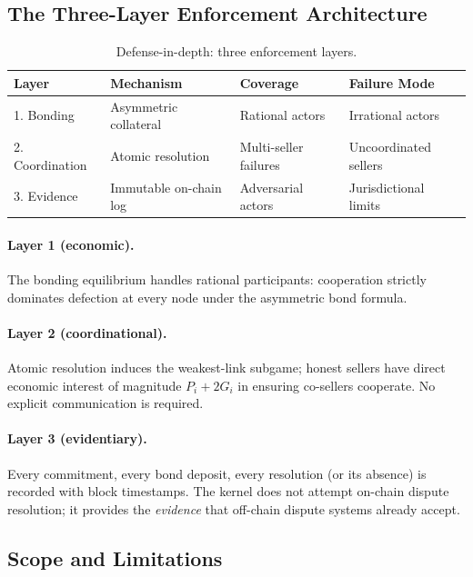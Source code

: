 \documentclass[11pt,a4paper]{article}
\theoremstyle{definition}
\theoremstyle{remark}
\newcommand{\pay}{P}
\newcommand{\cumval}{G}
\begin{document}
\subsection{The Three-Layer Enforcement Architecture}

\begin{table}[ht]
\centering
\caption{Defense-in-depth: three enforcement layers.}
\label{tab:enforcement}
\begin{tabular}{llll}
\toprule
\textbf{Layer} & \textbf{Mechanism} & \textbf{Coverage} & \textbf{Failure Mode} \\
\midrule
1. Bonding & Asymmetric collateral & Rational actors & Irrational actors \\
2. Coordination & Atomic resolution & Multi-seller failures & Uncoordinated sellers \\
3. Evidence & Immutable on-chain log & Adversarial actors & Jurisdictional limits \\
\bottomrule
\end{tabular}
\end{table}

\paragraph{Layer 1 (economic).}
The bonding equilibrium handles rational participants: cooperation
strictly dominates defection at every node under the asymmetric
bond formula.

\paragraph{Layer 2 (coordinational).}
Atomic resolution induces the weakest-link subgame; honest sellers
have direct economic interest of magnitude $\pay_i + 2\cumval_i$ in
ensuring co-sellers cooperate. No explicit communication is required.

\paragraph{Layer 3 (evidentiary).}
Every commitment, every bond deposit, every resolution (or its
absence) is recorded with block timestamps. The kernel does not
attempt on-chain dispute resolution; it provides the \emph{evidence}
that off-chain dispute systems already accept.

\subsection{Scope and Limitations}
\label{sec:scope}
\end{document}

